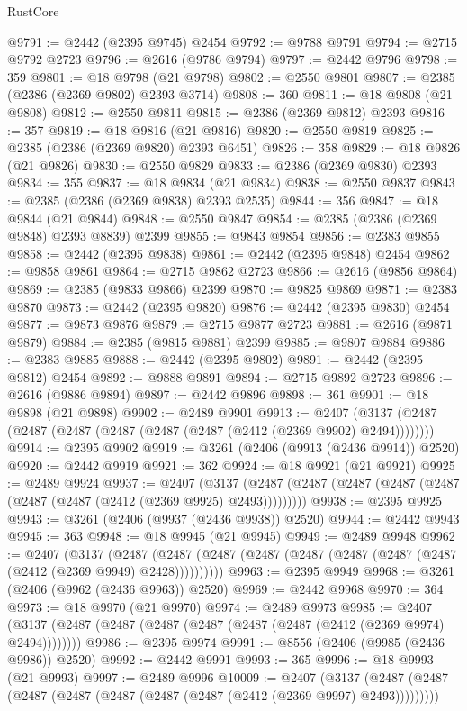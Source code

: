 \begin{lexlean}{RustCore}
\begin{coremodule}
@9791 := @2442 (@2395 @9745) @2454
@9792 := @9788 @9791
@9794 := @2715 @9792 @2723
@9796 := @2616 (@9786 @9794)
@9797 := @2442 @9796
@9798 := 359
@9801 := @18 @9798 (@21 @9798)
@9802 := @2550 @9801
@9807 := @2385 (@2386 (@2369 @9802) @2393 @3714)
@9808 := 360
@9811 := @18 @9808 (@21 @9808)
@9812 := @2550 @9811
@9815 := @2386 (@2369 @9812) @2393
@9816 := 357
@9819 := @18 @9816 (@21 @9816)
@9820 := @2550 @9819
@9825 := @2385 (@2386 (@2369 @9820) @2393 @6451)
@9826 := 358
@9829 := @18 @9826 (@21 @9826)
@9830 := @2550 @9829
@9833 := @2386 (@2369 @9830) @2393
@9834 := 355
@9837 := @18 @9834 (@21 @9834)
@9838 := @2550 @9837
@9843 := @2385 (@2386 (@2369 @9838) @2393 @2535)
@9844 := 356
@9847 := @18 @9844 (@21 @9844)
@9848 := @2550 @9847
@9854 := @2385 (@2386 (@2369 @9848) @2393 @8839) @2399
@9855 := @9843 @9854
@9856 := @2383 @9855
@9858 := @2442 (@2395 @9838)
@9861 := @2442 (@2395 @9848) @2454
@9862 := @9858 @9861
@9864 := @2715 @9862 @2723
@9866 := @2616 (@9856 @9864)
@9869 := @2385 (@9833 @9866) @2399
@9870 := @9825 @9869
@9871 := @2383 @9870
@9873 := @2442 (@2395 @9820)
@9876 := @2442 (@2395 @9830) @2454
@9877 := @9873 @9876
@9879 := @2715 @9877 @2723
@9881 := @2616 (@9871 @9879)
@9884 := @2385 (@9815 @9881) @2399
@9885 := @9807 @9884
@9886 := @2383 @9885
@9888 := @2442 (@2395 @9802)
@9891 := @2442 (@2395 @9812) @2454
@9892 := @9888 @9891
@9894 := @2715 @9892 @2723
@9896 := @2616 (@9886 @9894)
@9897 := @2442 @9896
@9898 := 361
@9901 := @18 @9898 (@21 @9898)
@9902 := @2489 @9901
@9913 := @2407 (@3137 (@2487 (@2487 (@2487 (@2487 (@2487 (@2487 (@2412 (@2369 @9902) @2494))))))))
@9914 := @2395 @9902
@9919 := @3261 (@2406 (@9913 (@2436 @9914)) @2520)
@9920 := @2442 @9919
@9921 := 362
@9924 := @18 @9921 (@21 @9921)
@9925 := @2489 @9924
@9937 := @2407
    (@3137 (@2487 (@2487 (@2487 (@2487 (@2487 (@2487 (@2487 (@2412 (@2369 @9925) @2493)))))))))
@9938 := @2395 @9925
@9943 := @3261 (@2406 (@9937 (@2436 @9938)) @2520)
@9944 := @2442 @9943
@9945 := 363
@9948 := @18 @9945 (@21 @9945)
@9949 := @2489 @9948
@9962 := @2407
    (@3137
      (@2487 (@2487 (@2487 (@2487 (@2487 (@2487 (@2487 (@2487 (@2412 (@2369 @9949) @2428))))))))))
@9963 := @2395 @9949
@9968 := @3261 (@2406 (@9962 (@2436 @9963)) @2520)
@9969 := @2442 @9968
@9970 := 364
@9973 := @18 @9970 (@21 @9970)
@9974 := @2489 @9973
@9985 := @2407 (@3137 (@2487 (@2487 (@2487 (@2487 (@2487 (@2487 (@2412 (@2369 @9974) @2494))))))))
@9986 := @2395 @9974
@9991 := @8556 (@2406 (@9985 (@2436 @9986)) @2520)
@9992 := @2442 @9991
@9993 := 365
@9996 := @18 @9993 (@21 @9993)
@9997 := @2489 @9996
@10009 := @2407
    (@3137 (@2487 (@2487 (@2487 (@2487 (@2487 (@2487 (@2487 (@2412 (@2369 @9997) @2493)))))))))

\end{coremodule}
\end{lexlean}
